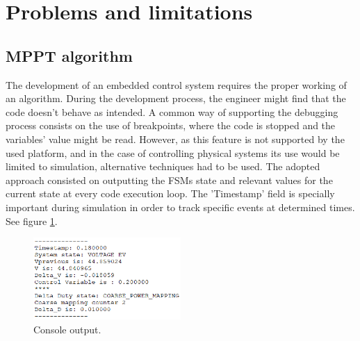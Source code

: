 \section{Problems and limitations}










\subsection{MPPT algorithm}
The development of an embedded control system requires the proper working of an algorithm. During the development process, the engineer might find that the code doesn't behave as intended. A common way of supporting the debugging process consists on the use of breakpoints, where the code is stopped and the variables' value might be read. However, as this feature is not supported by the used platform, and in the case of controlling physical systems its use would be limited to simulation, alternative techniques had to be used. The adopted approach consisted on outputting the FSMs state and relevant values for the current state at every code execution loop. The 'Timestamp' field is specially important during simulation in order to track specific events at determined times. See figure \ref{console_output}.

\begin{figure}[htbp]
	\begin{center}
		\includegraphics[width=0.5\textwidth]{../Pictures/P1/Discussion/console_output.png}
		\caption{Console output.}
		\label{console_output}
	\end{center}	
\end{figure}

